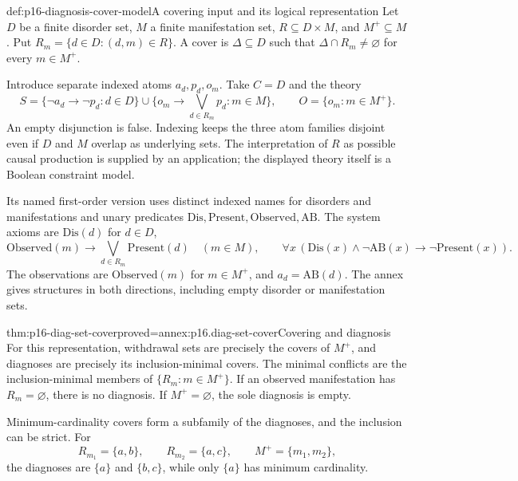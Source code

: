 \begin{hbdefinition}{def:p16-diagnosis-cover-model}{A covering input and its logical representation}
Let \(D\) be a finite disorder set, \(M\) a finite manifestation
set, \(R\subseteq D\times M\), and \(M^+\subseteq M\).
Put \(R_m=\{d\in D:(d,m)\in R\}\). A cover is
\(\Delta\subseteq D\) such that \(\Delta\cap R_m\ne\varnothing\)
for every \(m\in M^+\).

Introduce separate indexed atoms \(a_d,p_d,o_m\).
Take \(C=D\) and the theory
\[
 S=\{\neg a_d\to\neg p_d:d\in D\}
       \cup\{o_m\to\bigvee_{d\in R_m}p_d:m\in M\},
       \qquad O=\{o_m:m\in M^+\}.
\]
An empty disjunction is false. Indexing keeps the three
atom families disjoint even if \(D\) and \(M\) overlap
as underlying sets. The interpretation of \(R\) as
possible causal production is supplied by an application;
the displayed theory itself is a Boolean constraint model.

Its named first-order version uses distinct indexed names for
disorders and manifestations and unary predicates
\(\mathrm{Dis},\mathrm{Present},\mathrm{Observed},\mathrm{AB}\).
The system axioms are \(\mathrm{Dis}(d)\) for \(d\in D\),
\[
 \mathrm{Observed}(m)\to
       \bigvee_{d\in R_m}\mathrm{Present}(d)\quad(m\in M),
 \qquad
 \forall x\,(\mathrm{Dis}(x)\land\neg\mathrm{AB}(x)
                         \to\neg\mathrm{Present}(x)).
\]
The observations are \(\mathrm{Observed}(m)\) for
\(m\in M^+\), and \(a_d=\mathrm{AB}(d)\).
The annex gives structures in both directions, including
empty disorder or manifestation sets.
\end{hbdefinition}

\begin{hbtheorem}{thm:p16-diag-set-cover}{proved=annex:p16.diag-set-cover}{Covering and diagnosis}
For this representation, withdrawal sets are precisely
the covers of \(M^+\), and diagnoses are precisely its
inclusion-minimal covers. The minimal conflicts are
the inclusion-minimal members of
\(\{R_m:m\in M^+\}\).
If an observed manifestation has \(R_m=\varnothing\),
there is no diagnosis. If \(M^+=\varnothing\), the sole
diagnosis is empty.

Minimum-cardinality covers form a subfamily of the diagnoses,
and the inclusion can be strict. For
\[
 R_{m_1}=\{a,b\},\qquad R_{m_2}=\{a,c\},\qquad
                 M^+=\{m_1,m_2\},
\]
the diagnoses are \(\{a\}\) and \(\{b,c\}\), while only
\(\{a\}\) has minimum cardinality.
\end{hbtheorem}

